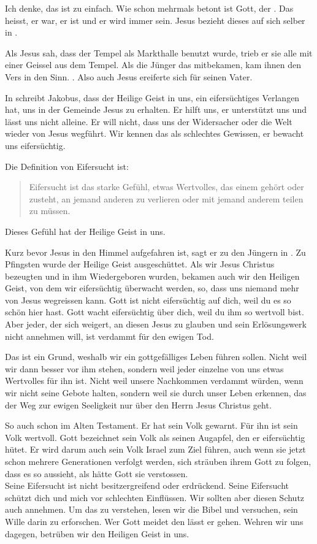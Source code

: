\begin{otsblock}[Einführung]
    Ich denke, das ist zu einfach. Wie schon mehrmals betont ist Gott, der .  Das heisst, er war, er ist und er wird immer sein. Jesus bezieht dieses  auf sich selber in . 

    Als Jesus sah, dass der Tempel als Markthalle benutzt wurde, trieb er sie alle mit einer Geissel aus dem Tempel. Als die Jünger das mitbekamen, kam ihnen den Vers  in den Sinn. . Also auch Jesus ereiferte sich für seinen Vater.

    In  schreibt Jakobus, dass der Heilige Geist in uns, ein eifersüchtiges Verlangen hat, uns in der Gemeinde Jesus zu erhalten. Er hilft uns, er unterstützt uns und lässt uns nicht alleine. Er will nicht, dass uns der Widersacher oder die Welt wieder von Jesus wegführt. Wir kennen das als schlechtes Gewissen, er bewacht uns eifersüchtig.

    Die Definition von Eifersucht ist:
    \begin{quote}
        Eifersucht ist das starke Gefühl, etwas Wertvolles, das einem gehört oder zusteht, an jemand anderen zu verlieren oder mit jemand anderem teilen zu müssen.        
    \end{quote}
    Dieses Gefühl hat der Heilige Geist in uns.

    Kurz bevor Jesus in den Himmel aufgefahren ist, sagt er zu den Jüngern in . Zu Pfingsten wurde der Heilige Geist ausgeschüttet. Als wir Jesus Christus bezeugten und in ihm Wiedergeboren wurden, bekamen auch wir den Heiligen Geist, von dem wir eifersüchtig überwacht werden, so, dass uns niemand mehr von Jesus wegreissen kann. Gott ist nicht eifersüchtig auf dich, weil du es so schön hier hast. Gott wacht eifersüchtig über dich, weil du ihm so wertvoll bist. Aber jeder, der sich weigert, an diesen Jesus zu glauben und sein Erlösungswerk nicht annehmen will, ist verdammt für den ewigen Tod. 

    Das ist ein Grund, weshalb wir ein gottgefälliges Leben führen sollen. Nicht weil wir dann besser vor ihm stehen, sondern weil jeder einzelne von uns etwas Wertvolles für ihn ist. Nicht weil unsere Nachkommen verdammt würden, wenn wir nicht seine Gebote halten, sondern weil sie durch unser Leben erkennen, das der Weg zur ewigen Seeligkeit nur über den Herrn Jesus Christus geht.

    So auch schon im Alten Testament. Er hat sein Volk gewarnt. Für ihn ist sein Volk wertvoll. Gott bezeichnet sein Volk als seinen Augapfel, den er eifersüchtig hütet. Er wird darum auch sein Volk Israel zum Ziel führen, auch wenn sie jetzt schon mehrere Generationen verfolgt werden, sich sträuben ihrem Gott zu folgen, dass es so aussieht, als hätte Gott sie verstossen.\\
    Seine Eifersucht ist nicht besitzergreifend oder erdrückend. Seine Eifersucht schützt dich und mich vor schlechten Einflüssen. Wir sollten aber diesen Schutz auch annehmen. Um das zu verstehen, lesen wir die Bibel und versuchen, sein Wille darin zu erforschen. Wer Gott meidet den lässt er gehen. Wehren wir uns dagegen, betrüben wir den Heiligen Geist in uns.

\end{otsblock}